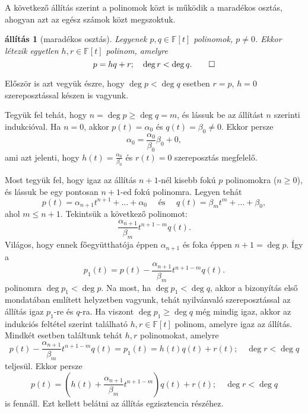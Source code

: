 \documentclass[9pt,showtrims]{memoir}
\makeatletter
\renewenvironment{proof}[1][\proofname]
    {\par\pushQED{\qed}%
    \normalfont \topsep6\p@\@plus6\p@\relax
    \trivlist
    \item[\hskip\labelsep
        \itshape
    #1\@addpunct{:}]\ignorespaces}
    {\popQED\endtrivlist\@endpefalse}
\theoremstyle{plain}
\newtheorem{proposition}{állítás}[chapter]
\theoremstyle{remark}
\theoremstyle{definition}
\renewcommand{\mathbf}{\mathbb}
\makeatother
\begin{document}
A következő állítás szerint a polinomok közt is működik a maradékos osztás,
ahogyan azt az egész számok közt megszoktuk.
\begin{proposition}[maradékos osztás]
    Legyenek $p,q\in\mathbf{F}\left[ t \right]$ polinomok, $p\neq 0$.
    Ekkor létezik egyetlen $h,r\in\mathbf{F}\left[ t \right]$ polinom, amelyre
    \[
        p
        =
        hq+r;
        \quad
        \deg r < \deg q.\qedhere
    \]
\end{proposition}
\begin{proof}
    Először is azt vegyük észre, hogy $\deg p<\deg q$ esetben $r=p$, 
    $h=0$ szereposztással készen is vagyunk.

    Tegyük fel tehát, hogy $n=\deg p\geq \deg q=m$, és lássuk be az állítást $n$ szerinti indukcióval.
    Ha $n=0$, akkor $p\left( t \right)=\alpha_0$ és $q\left( t \right)=\beta_0\neq 0$.
    Ekkor persze
    \[
        \alpha_0=\frac{\alpha_0}{\beta_0}\beta_0+0,
    \]
    ami azt jelenti, hogy $h\left( t \right)=\frac{\alpha_0}{\beta_0}$ és $r\left( t \right)=0$ szereposztás
    megfelelő.

    Most tegyük fel, 
    hogy igaz az állítás $n+1$-nél kisebb fokú $p$ polinomokra ($n\geq 0$),
    és lássuk be egy pontosan $n+1$-ed fokú polinomra.
    Legyen tehát
    \[
        p\left( t \right)=\alpha_{n+1}t^{n+1}+\dots+\alpha_0
        \quad\text{ és }\quad
        q\left( t \right)=\beta_{m}t^m+\dots+\beta_0,
    \]
    ahol $m\leq n+1$.
    Tekintsük a következő polinomot:
    \[
        \frac{\alpha_{n+1}}{\beta_m}t^{n+1-m}q\left( t \right).
    \]
    Világos, hogy ennek főegyütthatója éppen $\alpha_{n+1}$ és foka éppen $n+1=\deg p$.
    Így a 
    \[
        p_1\left( t \right)
        =
        p\left( t \right)-
        \frac{\alpha_{n+1}}{\beta_m}t^{n+1-m}q\left( t \right).
    \]
    polinomra $\deg p_1<\deg p$.
    Na most, ha $\deg p_1<\deg q$, akkor a bizonyítás első mondatában említett helyzetben vagyunk,
    tehát nyilvánvaló szereposztással az állítás igaz $p_1$-re és $q$-ra.
    Ha viszont $\deg p_1\geq \deg q$ még mindig igaz, akkor az indukciós feltétel szerint található
    $h,r\in\mathbf{F}\left[ t \right]$ polinom, amelyre igaz az állítás.
    Mindkét esetben találtunk tehát $h,r$ polinomokat, amelyre
    \[
        p\left( t \right)-
        \frac{\alpha_{n+1}}{\beta_m}t^{n+1-m}q\left( t \right)
        =
        p_1\left( t \right)
        =
        h\left( t \right)q\left( t \right)+r\left( t \right);
        \quad
        \deg r < \deg q
    \]
    teljesül.
    Ekkor persze
    \[
        p\left( t \right)
        =
        \left( h\left( t \right)
        +
        \frac{\alpha_{n+1}}{\beta_m}t^{n+1-m}
        \right)
        q\left( t \right)
        +
        r\left( t \right);
        \quad
        \deg r < \deg q
    \]
    is fennáll. Ezt kellett belátni az állítás egzisztencia részéhez.
    

\end{proof}
\end{document}
